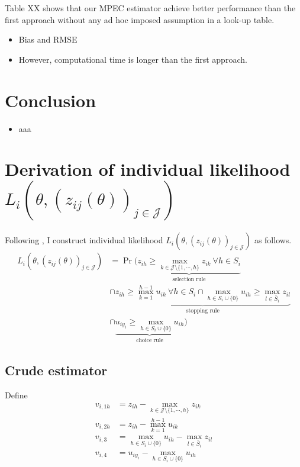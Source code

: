 \documentclass[12pt]{article}
\begin{document}
Table XX shows that our MPEC estimator achieve better performance than the first approach without any ad hoc imposed assumption in a look-up table. 
\begin{itemize}
    \item Bias and RMSE
    \item However, computational time is longer than the first approach.
\end{itemize}



\section{Conclusion}
\begin{itemize}
    \item aaa
\end{itemize}

\appendix
\section{Derivation of individual likelihood $L_{i}(\theta,(z_{ij}(\theta))_{j\in \mathcal{J}})$}

Following \cite{ursu2023sequential}, I construct individual likelihood $L_{i}(\theta,(z_{ij}(\theta))_{j\in \mathcal{J}})$ as follows. 
\begin{align*}
    L_{i}(\theta,(z_{ij}(\theta))_{j\in \mathcal{J}}) &= \Pr (\underbrace{z_{ih} \geq \max_{k \in \mathcal{J}\setminus \{1,\cdots,h\}} z_{ik} \: \forall h \in S_i}_{\text{selection rule}}\\
    & \cap \underbrace{z_{ih} \geq \max_{k = 1}^{h-1} u_{ik} \: \forall h \in S_i \cap \max_{h \in S_i \cup \{0\}} u_{ih} \geq \max_{l \in \bar{S}_i} z_{il} }_{\text{stopping rule}}\\
    & \cap \underbrace{u_{iy_i} \geq \max_{h \in S_i \cup \{0\}} u_{ih} }_{\text{choice rule}})
\end{align*}


\subsection{Crude estimator}

Define
\begin{align}
    v_{i,1h} &= z_{ih} - \max_{k \in \mathcal{J}\setminus \{1,\cdots,h\}} z_{ik} \label{v1}\\
    v_{i,2h} &=  z_{ih} - \max_{k = 1}^{h-1} u_{ik} \label{v2} \\
    v_{i,3} &= \max_{h \in S_i \cup \{0\}} u_{ih} - \max_{l \in \bar{S}_i} z_{il} \label{v3}\\
    v_{i,4} &= u_{iy_i} - \max_{h \in S_i \cup \{0\}} u_{ih}  \label{v4}
\end{align}
\end{document}

